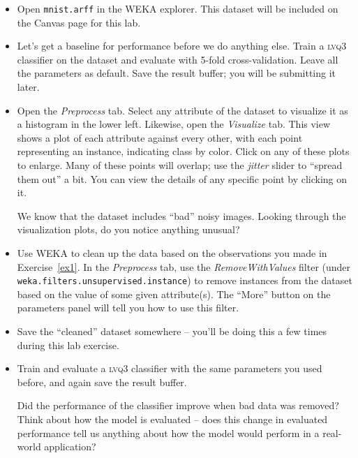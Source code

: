 \documentclass[11pt]{cselabheader}
\begin{document}
\begin{itemize}[leftmargin=*]
  \item Open \texttt{mnist.arff} in the WEKA explorer. This dataset will be included on the Canvas page for this lab.

  \item Let's get a baseline for performance before we do anything else. Train a \textsc{lvq3} classifier on the dataset and evaluate with 5-fold cross-validation. Leave all the parameters as default. Save the result buffer; you will be submitting it later.

  \item Open the \emph{Preprocess} tab. Select any attribute of the dataset to visualize it as a histogram in the lower left. Likewise, open the \emph{Visualize} tab. This view shows a plot of each attribute against every other, with each point representing an instance, indicating class by color. Click on any of these plots to enlarge. Many of these points will overlap; use the \emph{jitter} slider to ``spread them out'' a bit. You can view the details of any specific point by clicking on it.
 
  \begin{ex}\label{ex1}
    We know that the dataset includes ``bad'' noisy images. Looking through the visualization plots, do you notice anything unusual?
  \end{ex}

  \item Use WEKA to clean up the data based on the observations you made in Exercise~\ref{ex1}. In the \emph{Preprocess} tab, use the \emph{RemoveWithValues} filter (under \texttt{weka.filters.unsupervised.instance}) to remove instances from the dataset based on the value of some given attribute(s). The ``More'' button on the parameters panel will tell you how to use this filter.

  \item Save the ``cleaned'' dataset somewhere -- you'll be doing this a few times during this lab exercise.

  \item Train and evaluate a \textsc{lvq3} classifier with the same parameters you used before, and again save the result buffer.

  \begin{ex}
    Did the performance of the classifier improve when bad data was removed? Think about how the model is evaluated -- does this change in evaluated performance tell us anything about how the model would perform in a real-world application?
  \end{ex}
\end{itemize}
\end{document}
